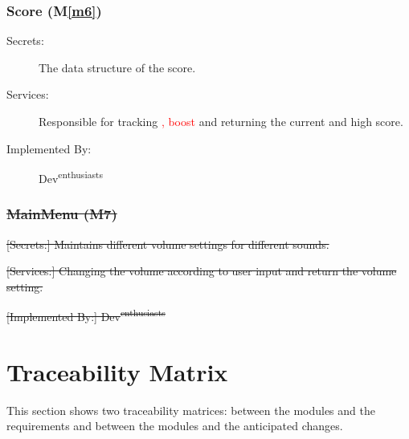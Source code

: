 \documentclass[12pt, titlepage]{article}
\newcommand{\mref}[1]{M\ref{#1}}
\begin{document}
\subsubsection{Score (\mref{m6})}
\begin{description}
\item[Secrets:] The data structure of the score.
\item[Services:] Responsible for tracking \textcolor{red}{, boost} and returning the current and high score.
\item[Implemented By:] Dev\textsuperscript{enthusiasts}
\end{description}

\subsubsection{\sout{MainMenu (M7)}}
\begin{description}
\item \sout{[Secrets:] Maintains different volume settings for  different sounds. }
\item \sout{[Services:] Changing the volume according to user input and return the volume setting.}
\item \sout{[Implemented By:] Dev\textsuperscript{enthusiasts}}
\end{description}

\section{Traceability Matrix} \label{SecTM}

This section shows two traceability matrices: between the modules and the
requirements and between the modules and the anticipated changes.
\end{document}
